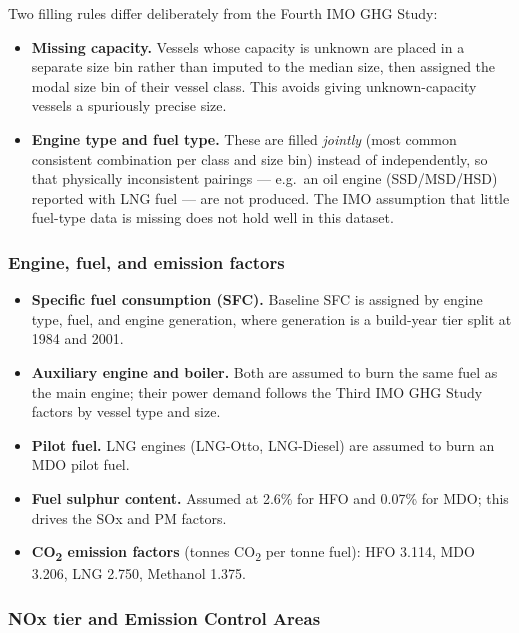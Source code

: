 \documentclass[
  11pt,
]{article}
\providecommand{\tightlist}{%
  \setlength{\itemsep}{0pt}\setlength{\parskip}{0pt}}
\begin{document}
Two filling rules differ deliberately from the Fourth IMO GHG Study:

\begin{itemize}
\tightlist
\item
  \textbf{Missing capacity.} Vessels whose capacity is unknown are placed
  in a separate size bin rather than imputed to the median size, then
  assigned the modal size bin of their vessel class. This avoids giving
  unknown-capacity vessels a spuriously precise size.
\item
  \textbf{Engine type and fuel type.} These are filled \emph{jointly}
  (most common consistent combination per class and size bin) instead of
  independently, so that physically inconsistent pairings --- e.g.\ an
  oil engine (SSD/MSD/HSD) reported with LNG fuel --- are not produced.
  The IMO assumption that little fuel-type data is missing does not hold
  well in this dataset.
\end{itemize}

\subsubsection{Engine, fuel, and emission
factors}\label{engine-fuel-factors}

\begin{itemize}
\tightlist
\item
  \textbf{Specific fuel consumption (SFC).} Baseline SFC is assigned by
  engine type, fuel, and engine generation, where generation is a
  build-year tier split at 1984 and 2001.
\item
  \textbf{Auxiliary engine and boiler.} Both are assumed to burn the same
  fuel as the main engine; their power demand follows the Third IMO GHG
  Study factors by vessel type and size.
\item
  \textbf{Pilot fuel.} LNG engines (LNG-Otto, LNG-Diesel) are assumed to
  burn an MDO pilot fuel.
\item
  \textbf{Fuel sulphur content.} Assumed at 2.6\% for HFO and 0.07\% for
  MDO; this drives the SOx and PM factors.
\item
  \textbf{CO\textsubscript{2} emission factors} (tonnes CO\textsubscript{2}
  per tonne fuel): HFO 3.114, MDO 3.206, LNG 2.750, Methanol 1.375.
\end{itemize}

\subsubsection{NOx tier and Emission Control
Areas}\label{nox-tier}
\end{document}
